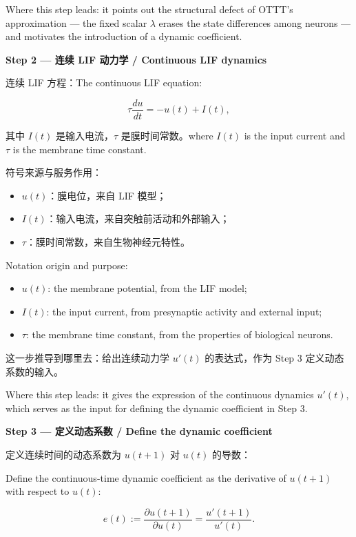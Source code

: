 \documentclass[journal,12pt,onecolumn]{IEEEtran}
\begin{document}
Where this step leads: it points out the structural defect of OTTT's approximation — the fixed scalar $\lambda$ erases the state differences among neurons — and motivates the introduction of a dynamic coefficient.

\medskip\noindent\textbf{Step 2 — 连续 LIF 动力学 / Continuous LIF dynamics}

连续 LIF 方程：The continuous LIF equation:

\begin{equation}
\tau \frac{du}{dt} = -u(t) + I(t),
\end{equation}

其中 $I(t)$ 是输入电流，$\tau$ 是膜时间常数。where $I(t)$ is the input current and $\tau$ is the membrane time constant.

符号来源与服务作用：
\begin{itemize}[leftmargin=1.5em,itemsep=2pt]
\item $u(t)$：膜电位，来自 LIF 模型；
\item $I(t)$：输入电流，来自突触前活动和外部输入；
\item $\tau$：膜时间常数，来自生物神经元特性。
\end{itemize}

Notation origin and purpose:
\begin{itemize}[leftmargin=1.5em,itemsep=2pt]
\item $u(t)$: the membrane potential, from the LIF model;
\item $I(t)$: the input current, from presynaptic activity and external input;
\item $\tau$: the membrane time constant, from the properties of biological neurons.
\end{itemize}

这一步推导到哪里去：给出连续动力学 $u'(t)$ 的表达式，作为 Step 3 定义动态系数的输入。

Where this step leads: it gives the expression of the continuous dynamics $u'(t)$, which serves as the input for defining the dynamic coefficient in Step 3.

\medskip\noindent\textbf{Step 3 — 定义动态系数 / Define the dynamic coefficient}

定义连续时间的动态系数为 $u(t+1)$ 对 $u(t)$ 的导数：

Define the continuous-time dynamic coefficient as the derivative of $u(t+1)$ with respect to $u(t)$:

\begin{equation}
e(t) := \frac{\partial u(t+1)}{\partial u(t)} = \frac{u'(t+1)}{u'(t)}.
\end{equation}
\end{document}
